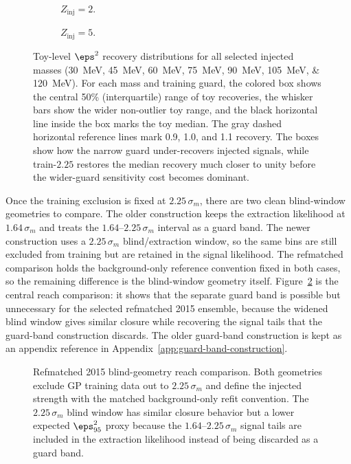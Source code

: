 \begin{figure}[H]
\centering
\begin{subfigure}[t]{0.98\linewidth}
  \centering
  \caption{$Z_{\mathrm{inj}}=2$.}
\end{subfigure}

\vspace{0.8em}

\begin{subfigure}[t]{0.98\linewidth}
  \centering
  \caption{$Z_{\mathrm{inj}}=5$.}
\end{subfigure}
\caption{Toy-level $\eps^2$ recovery distributions for all selected injected masses
(\SIlist{30;45;60;75;90;105;120}{MeV}). For each mass and training guard, the colored
box shows the central 50\% (interquartile) range of toy recoveries, the whisker bars
show the wider non-outlier toy range, and the black horizontal line inside the box
marks the toy median. The gray dashed horizontal reference lines mark 0.9, 1.0, and
1.1 recovery. The boxes show how the
narrow guard under-recovers injected signals, while train-$2.25$ restores the median
recovery much closer to unity before the wider-guard sensitivity cost becomes
dominant.}
\label{fig:guard-band-recovery-boxes}
\end{figure}

Once the training exclusion is fixed at $2.25\,\sigma_m$, there are two clean
blind-window geometries to compare. The older construction keeps the extraction likelihood at $1.64\,\sigma_m$ and treats the $1.64$--$2.25\,\sigma_m$ interval as a guard band. The newer construction uses a $2.25\,\sigma_m$ blind/extraction window, so the same bins are still excluded from training but are retained in the signal likelihood. The refmatched comparison holds the background-only reference convention fixed in both cases, so the remaining difference is the blind-window geometry itself. Figure~\ref{fig:refmatched-blind-geometry-reach} is the central reach comparison: it shows that the separate guard band is possible but unnecessary for the selected refmatched 2015 ensemble, because the widened blind window gives similar closure while recovering the signal tails that the guard-band construction discards. The older guard-band construction is kept as an appendix reference in Appendix~\ref{app:guard-band-construction}.

\begin{figure}[h!]
\centering
{}
\caption{Refmatched 2015 blind-geometry reach comparison. Both geometries exclude GP training data out to $2.25\,\sigma_m$ and define the injected strength with the matched background-only refit convention. The $2.25\,\sigma_m$ blind window has similar closure behavior but a lower expected $\eps^2_{95}$ proxy because the $1.64$--$2.25\,\sigma_m$ signal tails are included in the extraction likelihood instead of being discarded as a guard band.}
\label{fig:refmatched-blind-geometry-reach}
\end{figure}

